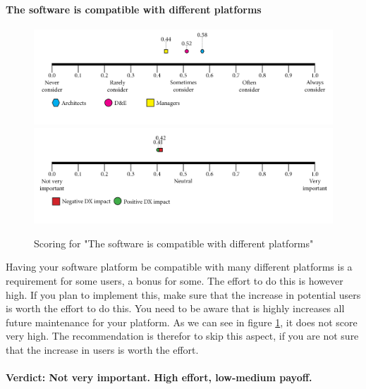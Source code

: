     \paragraph{The software is compatible with different platforms}
    \begin{figure}[H]
        \centering
        \includegraphics[width=\linewidth]{scorelines/aspect12.png}
        \includegraphics[width=\linewidth]{dxscorelines/dxaspect12.png}
        \caption{Scoring for "The software is compatible with different platforms"}
        \label{fig:aspect12}
    \end{figure}
    Having your software platform be compatible with many different platforms is a requirement for some users, a bonus for some. The effort to do this is however high. If you plan to implement this, make sure that the increase in potential users is worth the effort to do this. You need to be aware that is highly increases all future maintenance for your platform. As we can see in figure \ref{fig:aspect12}, it does not score very high. The recommendation is therefor to skip this aspect, if you are not sure that the increase in users is worth the effort. \\ \\
    \textbf{Verdict: Not very important. High effort, low-medium payoff.}
    
